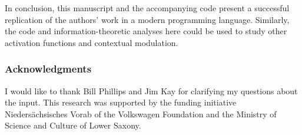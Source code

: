 In conclusion, this manuscript and the accompanying code present a successful replication of the authors' work in a modern programming language. Similarly, the code and information-theoretic analyses here could be used to study other activation functions and contextual modulation.

\subsubsection{Acknowledgments}

I would like to thank Bill Phillips and Jim Kay for clarifying my questions about the input. This research was supported by the funding initiative Niedersächsisches Vorab of the Volkswagen Foundation and the Ministry of Science and Culture of Lower Saxony.
